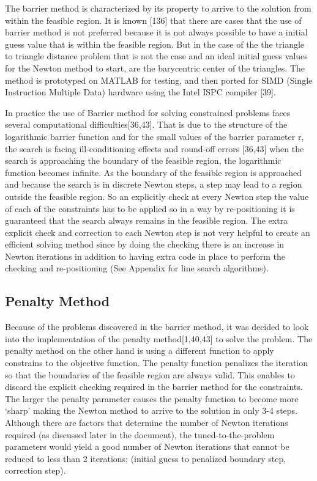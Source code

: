 \documentclass[times,12pt]{ACME2015article}
\begin{document}
The barrier method is characterized by its property to arrive to the solution from within the feasible region. It is known [136] that there are cases that the use of barrier method is not preferred because it is not always possible to have a initial guess value that is within the feasible region. But in the case of the the triangle to triangle distance problem that is not the case and an ideal initial guess values for the Newton method to start, are the barycentric center of the triangles. The method is prototyped on MATLAB for testing, and then ported for SIMD (Single Instruction Multiple Data) hardware using the Intel ISPC compiler [39].
 
In practice the use of Barrier method for solving constrained problems faces several computational difficulties[36,43]. That is due to the structure of the logarithmic barrier function and for the small values of the barrier parameter r, the search is facing ill-conditioning effects and round-off errors [36,43] when the search is approaching the boundary of the feasible region, the logarithmic function becomes infinite. As the boundary of the feasible region is approached and because the search is in discrete Newton steps, a step may lead to a region outside the feasible region. So an explicitly check at every Newton step the value of each of the constraints has to be applied so in a way by re-positioning it is guaranteed that the search always remains in the feasible region. The extra explicit check and correction to each Newton step is not very helpful to create an efficient solving method since by doing the checking there is an increase in Newton iterations in addition to having extra code in place to perform the checking and re-positioning (See Appendix for line search algorithms).

\subsection{Penalty Method}
Because of the problems discovered in the barrier method, it was decided to look into the implementation of the penalty method[1,40,43]  to solve the problem. The penalty method on the other hand is using a different function to apply constrains to the objective function. The penalty function penalizes the iteration so that the boundaries of the feasible region are always valid. This enables to discard the explicit checking required in the barrier method for the constraints. The larger the penalty parameter causes the penalty function to become more ‘sharp’ making the Newton method to arrive to the solution in only 3-4 steps. Although there are factors that determine the number of Newton iterations required (as discussed later in the document), the tuned-to-the-problem parameters would yield a good number of Newton iterations that cannot be reduced to less than 2 iterations; (initial guess to penalized boundary step, correction step).
\end{document}
